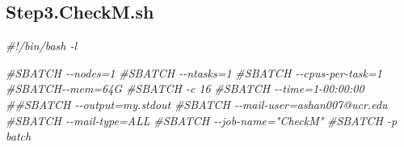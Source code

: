 \documentclass[
]{book}
\newenvironment{Shaded}{\begin{snugshade}}{\end{snugshade}}
\newcommand{\BuiltInTok}[1]{#1}
\newcommand{\CommentTok}[1]{\textcolor[rgb]{0.56,0.35,0.01}{\textit{#1}}}
\newcommand{\ControlFlowTok}[1]{\textcolor[rgb]{0.13,0.29,0.53}{\textbf{#1}}}
\newcommand{\StringTok}[1]{\textcolor[rgb]{0.31,0.60,0.02}{#1}}
\newcommand{\VariableTok}[1]{\textcolor[rgb]{0.00,0.00,0.00}{#1}}
\begin{document}
\begin{Shaded}
\end{Shaded}

\subsection{Step3.CheckM.sh}\label{CheckM2-script}

\begin{Shaded}
\begin{Highlighting}[]
\CommentTok{\#!/bin/bash {-}l}

\CommentTok{\#SBATCH {-}{-}nodes=1}
\CommentTok{\#SBATCH {-}{-}ntasks=1}
\CommentTok{\#SBATCH {-}{-}cpus{-}per{-}task=1}
\CommentTok{\#SBATCH{-}{-}mem=64G}
\CommentTok{\#SBATCH {-}c 16}
\CommentTok{\#SBATCH {-}{-}time=1{-}00:00:00}
\CommentTok{\#\#SBATCH {-}{-}output=my.stdout}
\CommentTok{\#SBATCH {-}{-}mail{-}user=ashan007@ucr.edu}
\CommentTok{\#SBATCH {-}{-}mail{-}type=ALL}
\CommentTok{\#SBATCH {-}{-}job{-}name="CheckM"}
\CommentTok{\#SBATCH {-}p batch}


\end{Highlighting}
\end{Shaded}
\end{document}
